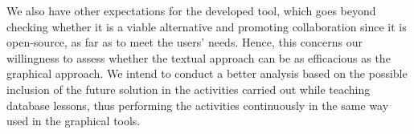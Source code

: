 We also have other expectations for the developed tool, which goes beyond checking whether it is a viable alternative and promoting collaboration since it is open-source, as far as to meet the users' needs.
Hence, this concerns our willingness to assess whether the textual approach can be as efficacious as the graphical approach.
We intend to conduct a better analysis based on the possible inclusion of the future solution in the activities carried out while teaching database lessons, thus performing the activities continuously in the same way used in the graphical tools.


